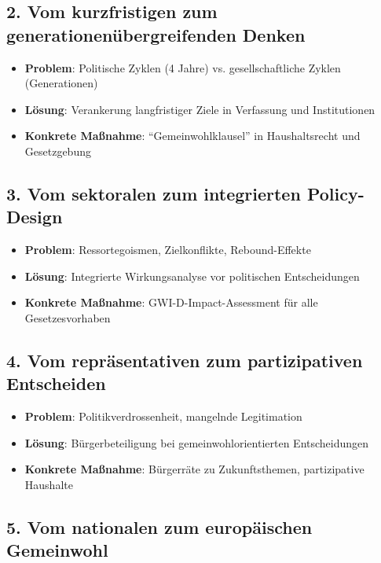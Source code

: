 \subsection{2. Vom kurzfristigen zum generationenübergreifenden Denken}

\begin{itemize}
    \item \textbf{Problem}: Politische Zyklen (4 Jahre) vs. gesellschaftliche Zyklen (Generationen)
    \item \textbf{Lösung}: Verankerung langfristiger Ziele in Verfassung und Institutionen
    \item \textbf{Konkrete Maßnahme}: \enquote{Gemeinwohlklausel} in Haushaltsrecht und Gesetzgebung
\end{itemize}

\subsection{3. Vom sektoralen zum integrierten Policy-Design}

\begin{itemize}
    \item \textbf{Problem}: Ressortegoismen, Zielkonflikte, Rebound-Effekte
    \item \textbf{Lösung}: Integrierte Wirkungsanalyse vor politischen Entscheidungen
    \item \textbf{Konkrete Maßnahme}: GWI-D-Impact-Assessment für alle Gesetzesvorhaben
\end{itemize}

\subsection{4. Vom repräsentativen zum partizipativen Entscheiden}

\begin{itemize}
    \item \textbf{Problem}: Politikverdrossenheit, mangelnde Legitimation
    \item \textbf{Lösung}: Bürgerbeteiligung bei gemeinwohlorientierten Entscheidungen
    \item \textbf{Konkrete Maßnahme}: Bürgerräte zu Zukunftsthemen, partizipative Haushalte
\end{itemize}

\subsection{5. Vom nationalen zum europäischen Gemeinwohl}

